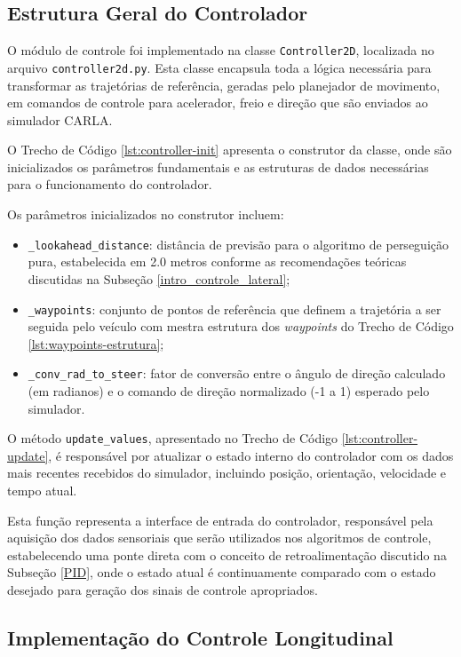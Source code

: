 \subsection{Estrutura Geral do Controlador}

O módulo de controle foi implementado na classe \texttt{Controller2D}, localizada no arquivo \texttt{controller2d.py}. Esta classe encapsula toda a lógica necessária para transformar as trajetórias de referência, geradas pelo planejador de movimento, em comandos de controle para acelerador, freio e direção que são enviados ao simulador CARLA.

O Trecho de Código \ref{lst:controller-init} apresenta o construtor da classe, onde são inicializados os parâmetros fundamentais e as estruturas de dados necessárias para o funcionamento do controlador.

Os parâmetros inicializados no construtor incluem:

\begin{itemize}
    \item \texttt{\_lookahead\_distance}: distância de previsão para o algoritmo de perseguição pura, estabelecida em 2.0 metros conforme as recomendações teóricas discutidas na Subseção \ref{intro_controle_lateral};
    \item \texttt{\_waypoints}: conjunto de pontos de referência que definem a trajetória a ser seguida pelo veículo com mestra estrutura dos \textit{waypoints} do Trecho de Código \ref{lst:waypoints-estrutura};
    \item \texttt{\_conv\_rad\_to\_steer}: fator de conversão entre o ângulo de direção calculado (em radianos) e o comando de direção normalizado (-1 a 1) esperado pelo simulador.
\end{itemize}

O método \texttt{update\_values}, apresentado no Trecho de Código \ref{lst:controller-update}, é responsável por atualizar o estado interno do controlador com os dados mais recentes recebidos do simulador, incluindo posição, orientação, velocidade e tempo atual.

Esta função representa a interface de entrada do controlador, responsável pela aquisição dos dados sensoriais que serão utilizados nos algoritmos de controle, estabelecendo uma ponte direta com o conceito de retroalimentação discutido na Subseção \ref{PID}, onde o estado atual é continuamente comparado com o estado desejado para geração dos sinais de controle apropriados.

\subsection{Implementação do Controle Longitudinal} \label{subsec:PID_implementation}

